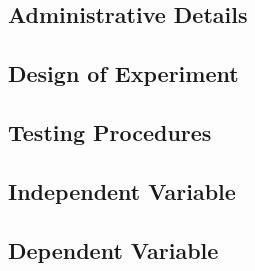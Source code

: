 \subsection{Administrative Details}

\subsection{Design of Experiment}

\subsection{Testing Procedures}

\subsection{Independent Variable}

\subsection{Dependent Variable}
